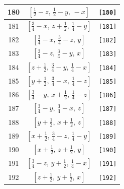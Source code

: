 \documentclass[fleqn,8pt]{jsarticle}
\begin{document}
\begin{longtable}{ccc}
180 & $\left[ \frac{1}{2} - z,\, \frac{1}{2} - y,\, - x \right]$ & {\tt [180]} \\ \hline
181 & $\left[ \frac{3}{4} - x,\, z + \frac{1}{2},\, \frac{1}{4} - y \right]$ & {\tt [181]} \\ \hline
182 & $\left[ \frac{3}{4} - x,\, \frac{3}{4} - z,\, y \right]$ & {\tt [182]} \\ \hline
183 & $\left[ \frac{3}{4} - z,\, \frac{3}{4} - y,\, x \right]$ & {\tt [183]} \\ \hline
184 & $\left[ z + \frac{1}{2},\, \frac{3}{4} - y,\, \frac{1}{4} - x \right]$ & {\tt [184]} \\ \hline
185 & $\left[ y + \frac{1}{2},\, \frac{3}{4} - x,\, \frac{1}{4} - z \right]$ & {\tt [185]} \\ \hline
186 & $\left[ \frac{3}{4} - y,\, x + \frac{1}{2},\, \frac{1}{4} - z \right]$ & {\tt [186]} \\ \hline
187 & $\left[ \frac{3}{4} - y,\, \frac{3}{4} - x,\, z \right]$ & {\tt [187]} \\ \hline
188 & $\left[ y + \frac{1}{2},\, x + \frac{1}{2},\, z \right]$ & {\tt [188]} \\ \hline
189 & $\left[ x + \frac{1}{2},\, \frac{3}{4} - z,\, \frac{1}{4} - y \right]$ & {\tt [189]} \\ \hline
190 & $\left[ x + \frac{1}{2},\, z + \frac{1}{2},\, y \right]$ & {\tt [190]} \\ \hline
191 & $\left[ \frac{3}{4} - z,\, y + \frac{1}{2},\, \frac{1}{4} - x \right]$ & {\tt [191]} \\ \hline
192 & $\left[ z + \frac{1}{2},\, y + \frac{1}{2},\, x \right]$ & {\tt [192]} \\
\end{longtable}
\end{document}
